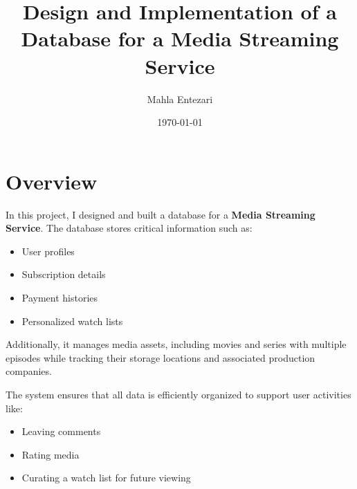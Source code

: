 \documentclass[13pt]{article}
\title{Design and Implementation of a Database for a Media Streaming Service}
\author{Mahla Entezari}
\date{\today}
\begin{document}
\maketitle

\section{Overview}
In this project, I designed and built a database for a \textbf{Media Streaming Service}. The database stores critical information such as:
\begin{itemize}
    \item User profiles
    \item Subscription details
    \item Payment histories
    \item Personalized watch lists
\end{itemize}

Additionally, it manages media assets, including movies and series with multiple episodes while tracking their storage locations and associated production companies. 

The system ensures that all data is efficiently organized to support user activities like:
\begin{itemize}
    \item Leaving comments
    \item Rating media
    \item Curating a watch list for future viewing
\end{itemize}
\end{document}
